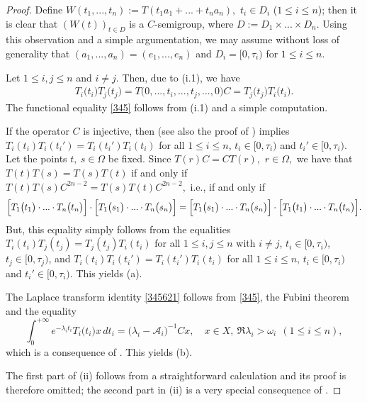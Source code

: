 \documentclass{amsart}
\theoremstyle{definition}
\theoremstyle{remark}
\numberwithin{equation}{section}
\begin{document}
\begin{proof}
Define $W(t_{1},...,t_{n}):=T(t_{1}a_{1}+...+t_{n}a_{n}),$ $t_{i}\in D_{i}$ ($1\leq i\leq n$); then it is clear that $(W(t))_{t\in D}$ is a $C$-semigroup, where $D:=D_{1}\times ... \times D_{n}.$ Using this observation and a simple argumentation, we may assume without loss of generality that $(a_{1},...,a_{n})=(e_{1},...,e_{n})$ and $D_{i}=[0,\tau_{i})$ for $1\leq i\leq n$.
 
Let $1\leq i, j\leq n$ and $i\neq j$. Then, due to (i.1), we have
\begin{align*}
T_{i}\bigl(t_{i}\bigr)T_{j}\bigl(t_{j}\bigr)=T\bigl(0,...,t_{i},...,t_{j},...,0\bigr)C=T_{j}\bigl(t_{j}\bigr)T_{i}\bigl(t_{i}\bigr).
\end{align*}
The functional equality \eqref{345} follows from (i.1) and a  simple computation. 

If the operator $C$ is injective, then \cite[Proposition 1.25]{knjiga} (see also the proof of  \cite[Lemma 2.1]{shaw2005}) implies $T_{i}(t_{i})T_{i}(t_{i}')=T_{i}(t_{i}')T_{i}(t_{i})$ for all $1\leq i\leq n$, $t_{i}\in [0,\tau_{i})$ and $t_{i}'\in [0,\tau_{i}).$ Let the points $t,\ s\in \Omega$ be fixed. Since $T(r)C=CT(r),$ $r\in \Omega,$ we have that  
$T(t)T(s)=T(s)T(t)$ if and only if $T(t)T(s)C^{2n-2}=T(s)T(t)C^{2n-2},$ i.e., if and only if
$$
\Bigl[T_{1}\bigl(t_{1}\bigr) \cdot ... \cdot T_{n}\bigl(t_{n}\bigr)\Bigr] \cdot \Bigl[ T_{1}\bigl(s_{1}\bigr) \cdot ... \cdot T_{n}\bigl(s_{n}\bigr)\Bigr]=\Bigl[ T_{1}\bigl(s_{1}\bigr) \cdot ... \cdot T_{n}\bigl(s_{n}\bigr)\Bigr] \cdot \Bigl[T_{1}\bigl(t_{1}\bigr) \cdot ... \cdot T_{n}\bigl(t_{n}\bigr)\Bigr].
$$
But, this equality simply follows from the equalities $T_{i}(t_{i})T_{j}(t_{j})=T_{j}(t_{j})T_{i}(t_{i})$ for all $1\leq i, j\leq n$ with $i\neq j$, $t_{i}\in [0,\tau_{i})$, $t_{j}\in [0,\tau_{j})$, and $T_{i}(t_{i})T_{i}(t_{i}')=T_{i}(t_{i}')T_{i}(t_{i})$ for all $1\leq i\leq n$, $t_{i}\in [0,\tau_{i})$ and $t_{i}'\in [0,\tau_{i}).$ This yields (a).

The  Laplace transform identity \eqref{345621} follows from \eqref{345}, the Fubini theorem and the equality
$$
\int^{+\infty}_{0}  e^{-\lambda_{i}t_{i}}T_{i}\bigl(t_{i}\bigr)x\, dt_{i}=\bigl( \lambda_{i}-{\mathcal A}_{i}\bigr)^{-1}Cx,\quad x\in X,\ \Re \lambda_{i}>\omega_{i} \ \ (1\leq i\leq n),
$$
which is a consequence of \cite[Theorem 3.2.5]{FKP}. This yields (b).

The first part of (ii) follows from a straightforward calculation and its proof is therefore omitted; the second part in (ii) is a very special consequence of \cite[Theorem 7.1.5]{apsclcs}.
\end{proof}
\end{document}
